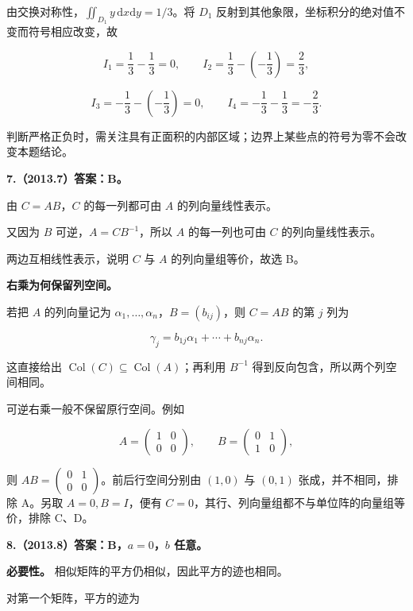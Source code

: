 \documentclass[UTF8,11pt,fontset=windows]{ctexart}
\begin{document}
由交换对称性，$\iint_{D_1}y\,\mathrm dx\mathrm dy=1/3$。将 $D_1$ 反射到其他象限，坐标积分的绝对值不变而符号相应改变，故

$$
I_1=\frac13-\frac13=0,
\qquad I_2=\frac13-\left(-\frac13\right)=\frac23,
$$

$$
I_3=-\frac13-\left(-\frac13\right)=0,
\qquad I_4=-\frac13-\frac13=-\frac23.
$$

判断严格正负时，需关注具有正面积的内部区域；边界上某些点的符号为零不会改变本题结论。

\clearpage

\textbf{7.（2013.7）答案：B。}

由 $C=AB$，$C$ 的每一列都可由 $A$ 的列向量线性表示。

又因为 $B$ 可逆，$A=CB^{-1}$，所以 $A$ 的每一列也可由 $C$ 的列向量线性表示。

两边互相线性表示，说明 $C$ 与 $A$ 的列向量组等价，故选 B。

\textbf{右乘为何保留列空间。}

若把 $A$ 的列向量记为 $\alpha_1,\ldots,\alpha_n$，$B=(b_{ij})$，则 $C=AB$ 的第 $j$ 列为

$$
\gamma_j=b_{1j}\alpha_1+\cdots+b_{nj}\alpha_n.
$$

这直接给出 $\operatorname{Col}(C)\subseteq\operatorname{Col}(A)$；再利用 $B^{-1}$ 得到反向包含，所以两个列空间相同。

可逆右乘一般不保留原行空间。例如

$$
A=\begin{pmatrix}1&0\\0&0\end{pmatrix},
\qquad B=\begin{pmatrix}0&1\\1&0\end{pmatrix},
$$

则 $AB=\begin{pmatrix}0&1\\0&0\end{pmatrix}$。前后行空间分别由 $(1,0)$ 与 $(0,1)$ 张成，并不相同，排除 A。另取 $A=0,B=I$，便有 $C=0$，其行、列向量组都不与单位阵的向量组等价，排除 C、D。

\clearpage

\textbf{8.（2013.8）答案：B，$a=0$，$b$ 任意。}

\textbf{必要性。} 相似矩阵的平方仍相似，因此平方的迹也相同。

对第一个矩阵，平方的迹为
\end{document}
